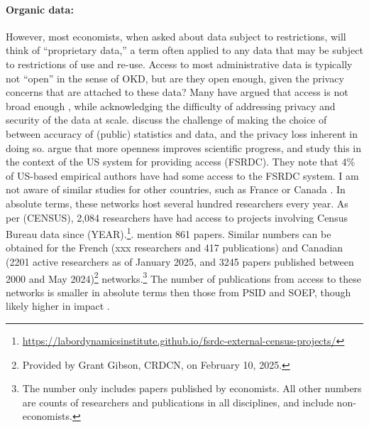 \documentclass{article}
\begin{document}
\paragraph{Organic data:} However, most economists, when asked about data subject to restrictions, will think of ``proprietary data,'' a term often applied to any data that may be subject to restrictions of use and re-use. Access to most administrative data is typically not ``open'' in the sense of OKD, but are they open enough, given the privacy concerns that are attached to these data? Many have argued that access is not broad enough \citep{card_expanding_2010,einav_economics_2014}, while acknowledging the difficulty of addressing privacy and security of the data at scale. \citet{abowd_economic_2018} discuss the challenge of making the choice of between accuracy of (public) statistics and data, and the privacy loss inherent in doing so. \citet{nagaraj_improving_2020} argue that more openness improves scientific progress, and \citet{nagaraj_how_2023} study this in the context of the US system for providing access (\ac{FSRDC}). They note that 4\% of US-based empirical authors have had some access to the FSRDC system. I am not aware of similar studies for other countries, such as France \citep[the equivalent system is the \ac{CASD}, ][]{gadouche_centre_2019} or Canada \citep{currie2015social}. In absolute terms, these networks host several hundred researchers every year. As per (CENSUS), 2,084 researchers have had access to projects involving Census Bureau data since (YEAR).\footnote{\url{https://labordynamicsinstitute.github.io/fsrdc-external-census-projects/}}. \citet{nagaraj_how_2023} mention 861 papers. Similar numbers can be obtained for the French (xxx researchers and 417 publications)
and Canadian (2201  active researchers as of January 2025, and 3245 papers published between 2000 and May 2024)\footnote{Provided by Grant Gibson, CRDCN, on February 10, 2025.} networks.\footnote{The \citet{nagaraj_how_2023} number only includes papers published by economists. All other numbers are counts of researchers and publications in all disciplines, and include non-economists.} The number of publications from access to these networks is smaller in absolute terms then those from PSID and SOEP, though likely higher in impact \citep{nagaraj_how_2023}.
\end{document}

